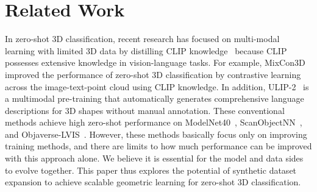 \section{Related Work}
 In zero-shot 3D classification, recent research has focused on multi-modal learning with limited 3D data by distilling CLIP knowledge~\cite{qi2023contrast, hegde2023clip, huang2023clip2point, xue2024ulip, liu2024openshape} because CLIP possesses extensive knowledge in vision-language tasks. For example, MixCon3D~\cite{gao2024sculpting} improved the performance of zero-shot 3D classification by contrastive learning across the image-text-point cloud using CLIP knowledge. 
In addition, ULIP-2~\cite{xue2024ulip} is a multimodal pre-training that automatically generates comprehensive language descriptions for 3D shapes without manual annotation.
These conventional methods achieve high zero-shot performance on ModelNet40~\cite{wu20153d}, ScanObjectNN~\cite{uy2019revisiting}, and Objaverse-LVIS~\cite{deitke2023objaverse}. However, these methods basically focus only on improving training methods, and there are limits to how much performance can be improved with this approach alone. We believe it is essential for the model and data sides to evolve together. This paper thus explores the potential of synthetic dataset expansion to achieve scalable geometric learning for zero-shot 3D classification.

